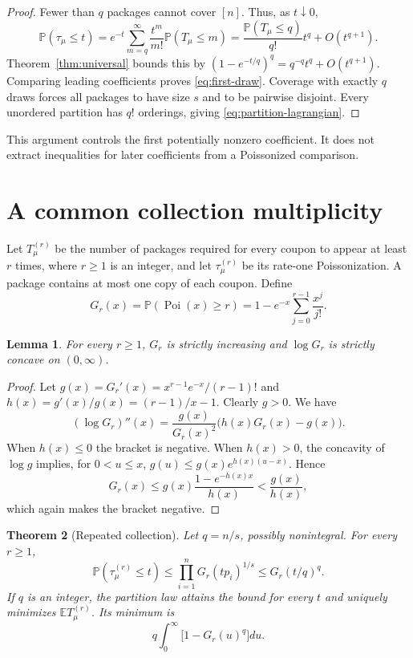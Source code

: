 \documentclass[11pt]{article}
\numberwithin{equation}{section}
\newtheorem{theorem}{Theorem}[section]
\newtheorem{lemma}[theorem]{Lemma}
\theoremstyle{remark}
\newcommand{\Pp}{\mathbb P}
\newcommand{\E}{\mathbb E}
\newcommand{\1}{\mathbf 1}
\newcommand{\Poi}{\operatorname{Poi}}
\begin{document}
\begin{proof}
Fewer than $q$ packages cannot cover $[n]$. Thus, as $t\downarrow0$,
\[
 \Pp(\tau_\mu\leq t)
 =e^{-t}\sum_{m=q}^{\infty}\frac{t^m}{m!}\Pp(T_\mu\leq m)
 =\frac{\Pp(T_\mu\leq q)}{q!}t^q+O(t^{q+1}).
\]
Theorem~\ref{thm:universal} bounds this by
$(1-e^{-t/q})^q=q^{-q}t^q+O(t^{q+1})$.
Comparing leading coefficients proves \eqref{eq:first-draw}. Coverage with exactly $q$ draws forces all packages to have size $s$ and to be pairwise disjoint. Every unordered partition has $q!$ orderings, giving \eqref{eq:partition-lagrangian}.
\end{proof}

This argument controls the first potentially nonzero coefficient. It does not extract inequalities for later coefficients from a Poissonized comparison.

\section{A common collection multiplicity}\label{sec:multiplicity}

Let $T_\mu^{(r)}$ be the number of packages required for every coupon to appear at least $r$ times, where $r\geq1$ is an integer, and let $\tau_\mu^{(r)}$ be its rate-one Poissonization. A package contains at most one copy of each coupon. Define
\[
 G_r(x)=\Pp(\Poi(x)\geq r)
       =1-e^{-x}\sum_{j=0}^{r-1}\frac{x^j}{j!}.
\]

\begin{lemma}\label{lem:gamma-concavity}
For every $r\geq1$, $G_r$ is strictly increasing and $\log G_r$ is strictly concave on $(0,\infty)$.
\end{lemma}

\begin{proof}
Let $g(x)=G_r'(x)=x^{r-1}e^{-x}/(r-1)!$ and
$h(x)=g'(x)/g(x)=(r-1)/x-1$. Clearly $g>0$. We have
\[
 (\log G_r)''(x)
 =\frac{g(x)}{G_r(x)^2}\bigl(h(x)G_r(x)-g(x)\bigr).
\]
When $h(x)\leq0$ the bracket is negative. When $h(x)>0$, the concavity of $\log g$ implies, for $0<u\leq x$,
$g(u)\leq g(x)e^{h(x)(u-x)}$. Hence
\[
 G_r(x)\leq g(x)\frac{1-e^{-h(x)x}}{h(x)}<\frac{g(x)}{h(x)},
\]
which again makes the bracket negative.
\end{proof}

\begin{theorem}[Repeated collection]\label{thm:multiplicity}
Let $q=n/s$, possibly nonintegral. For every $r\geq1$,
\begin{equation}\label{eq:multi-cdf}
 \Pp(\tau_\mu^{(r)}\leq t)
 \leq\prod_{i=1}^nG_r(tp_i)^{1/s}
 \leq G_r(t/q)^q.
\end{equation}
If $q$ is an integer, the partition law attains the bound for every $t$ and uniquely minimizes $\E T_\mu^{(r)}$. Its minimum is
\begin{equation}\label{eq:multi-mean}
 q\int_0^\infty\bigl[1-G_r(u)^q\bigr]du.
\end{equation}
\end{theorem}
\end{document}
